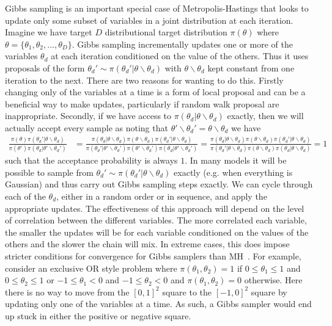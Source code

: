 Gibbs sampling is an important special case of Metropolis-Hastings that looks to update only some
subset of variables in a joint distribution at each iteration.  Imagine we have target $D$ distributional target distribution
$\pi(\theta)$ where $\theta = \{\theta_1,\theta_2,\dots,\theta_D\}$.  Gibbs sampling incrementally
updates one or more of the variables $\theta_d$ at each iteration conditioned on the value of the others.
Thus it uses proposals of the form $\theta_d' \sim \pi(\theta_d' | \theta \backslash \theta_d)$ with
$ \theta \backslash \theta_d$ kept constant from one iteration to the next.  There are two reasons
for wanting to do this.  Firstly changing only of the variables at a time is a form of local proposal and
can be a beneficial way to make updates, particularly if random walk proposal are inappropriate.  
Secondly, if we have access to $\pi(\theta_d | \theta \backslash \theta_d)$
exactly, then we will actually accept every sample as noting that $\theta' \backslash \theta_d' = \theta \backslash \theta_d$ we
have
\begin{align*}
\frac{\pi(\theta)\pi(\theta_d' | \theta \backslash \theta_d)}{\pi(\theta')\pi(\theta_d | \theta' \backslash \theta_d')}
&=\frac{\pi(\theta_d |  \theta \backslash \theta_d) \pi( \theta \backslash \theta_d)
	\pi(\theta_d' | \theta \backslash \theta_d)}
{\pi(\theta_d' |  \theta' \backslash \theta_d') \pi( \theta' \backslash \theta_d')\pi(\theta_d | \theta' \backslash \theta_d')} 
=\frac{\pi(\theta_d |  \theta \backslash \theta_d) \pi( \theta \backslash \theta_d)
	\pi(\theta_d' | \theta \backslash \theta_d)}
{\pi(\theta_d' |  \theta \backslash \theta_d) \pi( \theta \backslash \theta_d)\pi(\theta_d | \theta \backslash \theta_d)} 
= 1
\end{align*}
such that the acceptance probability is always $1$.
In many models it will be possible to sample from $\theta_d' \sim \pi(\theta_d' | \theta \backslash \theta_d)$
exactly (e.g. when everything is Gaussian) and thus carry out Gibbs sampling steps exactly.  We can cycle through each of
the $\theta_d$, either in a random order or in sequence, and apply the appropriate updates.  The
effectiveness of this approach will depend on the level of correlation between the different variables.  The more
correlated each variable, the smaller the updates will be for each variable conditioned on the values of the
others and the slower the chain will mix.  In extreme cases, this does impose stricter conditions
for convergence for Gibbs samplers than MH~\citep{roberts1994simple}.  For example, consider an exclusive
OR style problem where $\pi(\theta_1,\theta_2) = 1$ if $0\le\theta_1\le1$ and $0\le\theta_2\le1$
or $-1\le\theta_1<0$ and $-1\le\theta_2<0$ and $\pi(\theta_1,\theta_2) = 0$ otherwise.  Here there is no
way to move from the $[0,1]^2$ square to the $[-1,0]^2$ square by updating only one of the variables at a time.  As
such, a Gibbs sampler would end up stuck in either the positive or negative square.

